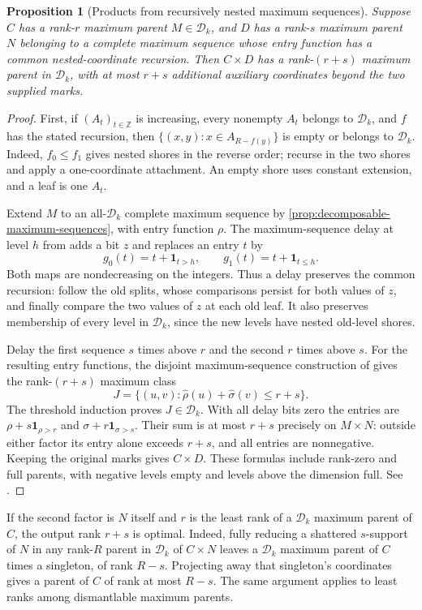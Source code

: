 \documentclass[11pt]{article}
\newtheorem{proposition}{Proposition}[section]
\theoremstyle{definition}
\begin{document}
\begin{proposition}[Products from recursively nested maximum sequences]
\label{prop:parent-nested-products}
Suppose $C$ has a rank-$r$ maximum parent $M\in\mathcal D_k$, and $D$
has a rank-$s$ maximum parent $N$ belonging to a complete maximum sequence
whose entry function has a common nested-coordinate recursion. Then
$C\times D$ has a rank-$(r+s)$ maximum parent in $\mathcal D_k$, with at
most $r+s$ additional auxiliary coordinates beyond the two supplied marks.
\end{proposition}
\begin{proof}
First, if $(A_t)_{t\in\mathbb Z}$ is increasing, every nonempty $A_t$
belongs to $\mathcal D_k$, and $f$ has the stated recursion, then
$\{(x,y):x\in A_{R-f(y)}\}$ is empty or belongs to $\mathcal D_k$.
Indeed, $f_0\le f_1$ gives nested shores in the reverse order; recurse in
the two shores and apply a one-coordinate attachment. An empty shore uses
constant extension, and a leaf is one $A_t$.

Extend $M$ to an all-$\mathcal D_k$ complete maximum sequence by
\cref{prop:decomposable-maximum-sequences}, with entry function $\rho$.
The maximum-sequence delay at level $h$ from \cite{MaxParents} adds a bit
$z$ and replaces an entry $t$ by
\[
 g_0(t)=t+\mathbf1_{t>h},\qquad g_1(t)=t+\mathbf1_{t\le h}.
\]
Both maps are nondecreasing on the integers. Thus a delay preserves the
common recursion: follow the old splits, whose comparisons persist for both
values of $z$, and finally compare the two values of $z$ at each old leaf.
It also preserves membership of every level in $\mathcal D_k$, since the
new levels have nested old-level shores.

Delay the first sequence $s$ times above $r$ and the second $r$ times
above $s$. For the resulting entry functions, the disjoint maximum-sequence
construction of \cite{MaxParents} gives the rank-$(r+s)$ maximum class
\[
 J=\{(u,v):\widehat\rho(u)+\widehat\sigma(v)\le r+s\}.
\]
The threshold induction proves $J\in\mathcal D_k$. With all delay bits
zero the entries are $\rho+s\mathbf1_{\rho>r}$ and
$\sigma+r\mathbf1_{\sigma>s}$. Their sum is at most $r+s$ precisely on
$M\times N$: outside either factor its entry alone exceeds $r+s$, and
all entries are nonnegative. Keeping the original marks gives $C\times D$.
These formulas include rank-zero and full parents, with negative levels
empty and levels above the dimension full. See \cite{Structural986}.
\end{proof}

If the second factor is $N$ itself and $r$ is the least rank of a
$\mathcal D_k$ maximum parent of $C$, the output rank $r+s$ is optimal.
Indeed, fully reducing a shattered $s$-support of $N$ in any rank-$R$
parent in $\mathcal D_k$ of $C\times N$ leaves a $\mathcal D_k$ maximum parent of
$C$ times a singleton, of rank $R-s$. Projecting away that singleton's
coordinates gives a parent of $C$ of rank at most $R-s$. The same argument
applies to least ranks among dismantlable maximum parents.
\end{document}
